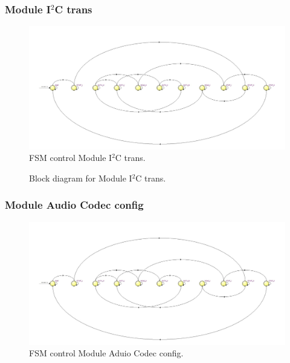 \subsubsection{Module I$^{2}$C trans}

\begin{figure}[H]
	\centering
	\includegraphics[width=.8\linewidth]{./my-chapters/my-diagrams/i2c_trans_reg_state.jpg}
	\caption{FSM control Module I$^{2}$C trans.}
\end{figure}

\begin{figure}[H]
	\centering
	\caption{Block diagram for Module I$^{2}$C trans.}
\end{figure}

\subsubsection{Module Audio Codec config}

\begin{figure}[H]
	\centering
	\includegraphics[width=.8\linewidth]{./my-chapters/my-diagrams/config_codec_i2c_trans_i2c_reg_state.jpg}
	\caption{FSM control Module Aduio Codec config.}
\end{figure}

